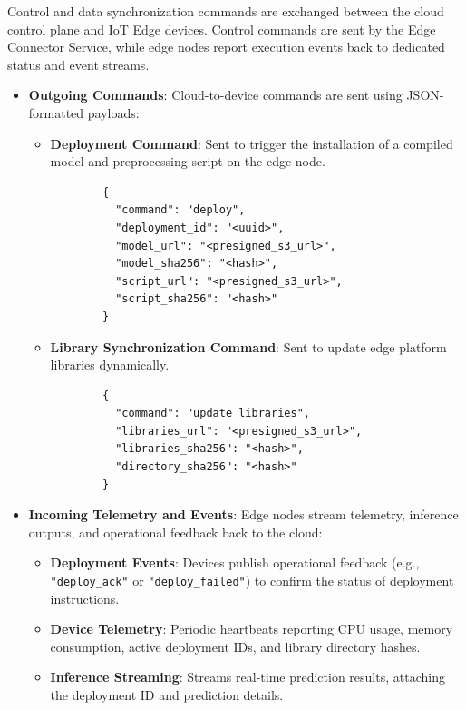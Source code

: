 Control and data synchronization commands are exchanged between the cloud control plane and \gls{IoT} Edge devices. Control commands are sent by the Edge Connector Service, while edge nodes report execution events back to dedicated status and event streams.

\begin{itemize}
    \item \textbf{Outgoing Commands}: Cloud-to-device commands are sent using \gls{JSON}-formatted payloads:
    \begin{itemize}
        \item \textbf{Deployment Command}: Sent to trigger the installation of a compiled model and preprocessing script on the edge node.
        \begin{verbatim}
        {
          "command": "deploy",
          "deployment_id": "<uuid>",
          "model_url": "<presigned_s3_url>",
          "model_sha256": "<hash>",
          "script_url": "<presigned_s3_url>",
          "script_sha256": "<hash>"
        }
        \end{verbatim}
    
        \item \textbf{Library Synchronization Command}: Sent to update edge platform libraries dynamically.
        \begin{verbatim}
        {
          "command": "update_libraries",
          "libraries_url": "<presigned_s3_url>",
          "libraries_sha256": "<hash>",
          "directory_sha256": "<hash>"
        }
        \end{verbatim}
    \end{itemize}

    \item \textbf{Incoming Telemetry and Events}: Edge nodes stream telemetry, inference outputs, and operational feedback back to the cloud:
    \begin{itemize}
        \item \textbf{Deployment Events}: Devices publish operational feedback (e.g., \texttt{"deploy\_ack"} or \texttt{"deploy\_failed"}) to confirm the status of deployment instructions.
        \item \textbf{Device Telemetry}: Periodic heartbeats reporting \gls{CPU} usage, memory consumption, active deployment \glspl{ID}, and library directory hashes.
        \item \textbf{Inference Streaming}: Streams real-time prediction results, attaching the deployment \gls{ID} and prediction details.
    \end{itemize}
\end{itemize}
